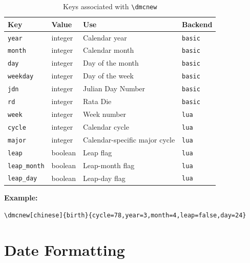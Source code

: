 \documentclass[10pt]{article}
\begin{document}
    \begin{table}[h!]
        \centering
        \caption{Keys associated with \texttt{\textbackslash dmcnew}}
        \label{tab:dmcnew-keys}
        \begin{tabular}{llll}
            \hline
            \textbf{Key}         & \textbf{Value} & \textbf{Use}                  & \textbf{Backend} \\ \hline
            \texttt{year}        & integer        & Calendar year                 & \texttt{basic}   \\
            \texttt{month}       & integer        & Calendar month                & \texttt{basic}   \\
            \texttt{day}         & integer        & Day of the month              & \texttt{basic}   \\
            \texttt{weekday}     & integer        & Day of the week               & \texttt{basic}   \\
            \texttt{jdn}         & integer        & Julian Day Number             & \texttt{basic}   \\
            \texttt{rd}          & integer        & Rata Die                      & \texttt{basic}   \\
            \texttt{week}        & integer        & Week number                   & \texttt{lua}     \\
            \texttt{cycle}       & integer        & Calendar cycle                & \texttt{lua}     \\
            \texttt{major}       & integer        & Calendar-specific major cycle & \texttt{lua}     \\ 
            \texttt{leap}        & boolean        & Leap flag                     & \texttt{lua}     \\
            \texttt{leap\_month} & boolean        & Leap-month flag               & \texttt{lua}     \\
            \texttt{leap\_day}   & boolean        & Leap-day flag                 & \texttt{lua}     \\ \hline
        \end{tabular}
    \end{table}
    
    \textbf{Example:}\par
    \verb|\dmcnew[chinese]{birth}{cycle=78,year=3,month=4,leap=false,day=24}|
    
    
\section{Date Formatting}
\end{document}
